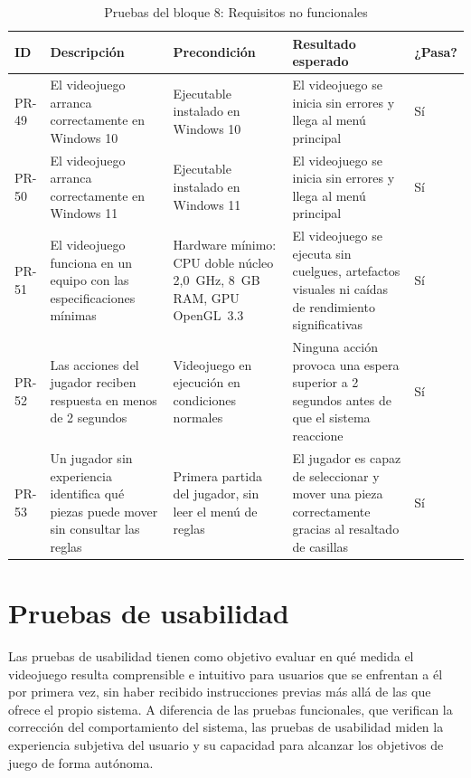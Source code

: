\begin{table}[H]
	\centering
	\small
	\begin{tabular}{|>{\centering\arraybackslash}p{1cm}|>{\centering\arraybackslash}p{4cm}|>{\centering\arraybackslash}p{4cm}|>{\centering\arraybackslash}p{4cm}|>{\centering\arraybackslash}p{1.5cm}|}
		\hline
		\textbf{ID} & \textbf{Descripción} & \textbf{Precondición} & \textbf{Resultado esperado} & \textbf{¿Pasa?} \\
		\hline
		PR-49 & El videojuego arranca correctamente en Windows 10 & Ejecutable instalado en Windows 10 & El videojuego se inicia sin errores y llega al menú principal & \cellcolor{green!40}Sí \\
		\hline
		PR-50 & El videojuego arranca correctamente en Windows 11 & Ejecutable instalado en Windows 11 & El videojuego se inicia sin errores y llega al menú principal & \cellcolor{green!40}Sí \\
		\hline
		PR-51 & El videojuego funciona en un equipo con las especificaciones mínimas & Hardware mínimo: CPU doble núcleo 2,0~GHz, 8~GB RAM, GPU OpenGL~3.3 & El videojuego se ejecuta sin cuelgues, artefactos visuales ni caídas de rendimiento significativas & \cellcolor{green!40}Sí \\
		\hline
		PR-52 & Las acciones del jugador reciben respuesta en menos de 2 segundos & Videojuego en ejecución en condiciones normales & Ninguna acción provoca una espera superior a 2 segundos antes de que el sistema reaccione & \cellcolor{green!40}Sí \\
		\hline
		PR-53 & Un jugador sin experiencia identifica qué piezas puede mover sin consultar las reglas & Primera partida del jugador, sin leer el menú de reglas & El jugador es capaz de seleccionar y mover una pieza correctamente gracias al resaltado de casillas & \cellcolor{green!40}Sí \\
		\hline
	\end{tabular}
	\caption{Pruebas del bloque 8: Requisitos no funcionales}
\end{table}

\clearpage

\section{Pruebas de usabilidad}

Las pruebas de usabilidad tienen como objetivo evaluar en qué medida el videojuego resulta comprensible e intuitivo para usuarios que se enfrentan a él por primera vez, sin haber recibido instrucciones previas más allá de las que ofrece el propio sistema. A diferencia de las pruebas funcionales, que verifican la corrección del comportamiento del sistema, las pruebas de usabilidad miden la experiencia subjetiva del usuario y su capacidad para alcanzar los objetivos de juego de forma autónoma.

